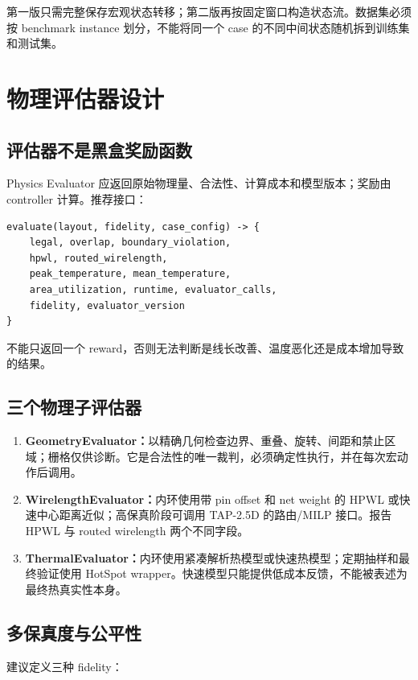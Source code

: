 \documentclass[UTF8,a4paper,11pt]{ctexart}
\begin{document}
第一版只需完整保存宏观状态转移；第二版再按固定窗口构造状态流。数据集必须按 benchmark instance 划分，不能将同一个 case 的不同中间状态随机拆到训练集和测试集。

\section{物理评估器设计}

\subsection{评估器不是黑盒奖励函数}

Physics Evaluator 应返回原始物理量、合法性、计算成本和模型版本；奖励由 controller 计算。推荐接口：

\begin{verbatim}
evaluate(layout, fidelity, case_config) -> {
    legal, overlap, boundary_violation,
    hpwl, routed_wirelength,
    peak_temperature, mean_temperature,
    area_utilization, runtime, evaluator_calls,
    fidelity, evaluator_version
}
\end{verbatim}

不能只返回一个 reward，否则无法判断是线长改善、温度恶化还是成本增加导致的结果。

\subsection{三个物理子评估器}

\begin{enumerate}
    \item \textbf{GeometryEvaluator：}以精确几何检查边界、重叠、旋转、间距和禁止区域；栅格仅供诊断。它是合法性的唯一裁判，必须确定性执行，并在每次宏动作后调用。
    \item \textbf{WirelengthEvaluator：}内环使用带 pin offset 和 net weight 的 HPWL 或快速中心距离近似；高保真阶段可调用 TAP-2.5D 的路由/MILP 接口。报告 HPWL 与 routed wirelength 两个不同字段。
    \item \textbf{ThermalEvaluator：}内环使用紧凑解析热模型或快速热模型；定期抽样和最终验证使用 HotSpot wrapper。快速模型只能提供低成本反馈，不能被表述为最终热真实性本身。
\end{enumerate}

\subsection{多保真度与公平性}

建议定义三种 fidelity：
\end{document}

